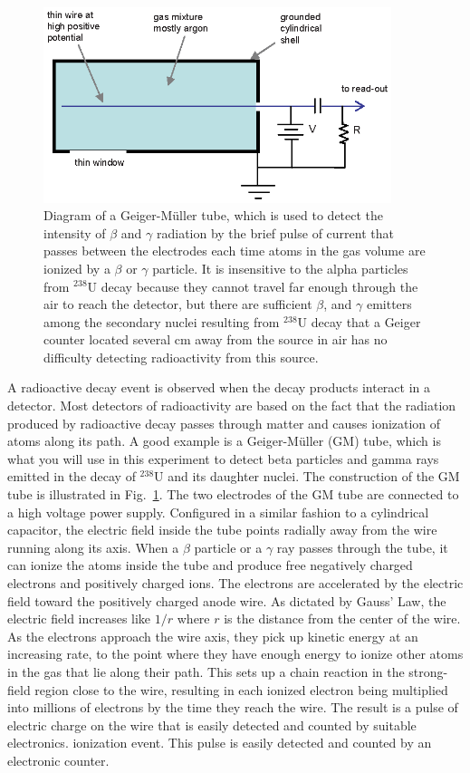 \documentclass{revtex4}
\begin{document}
\begin{figure}
\includegraphics[width=4in]{geigertube.eps}
\caption{\label{geigertube}
Diagram of a Geiger-M\"{u}ller tube, which is used to detect the intensity
of $\beta$ and $\gamma$ radiation by the brief pulse of current that passes
between the electrodes each time atoms in the gas volume are ionized by a
$\beta$ or $\gamma$ particle.  It is insensitive to the alpha particles
from $^{238}$U decay because they cannot travel far enough through the air
to reach the detector, but there are sufficient $\beta$, and $\gamma$
emitters among the secondary nuclei resulting from $^{238}$U decay that a
Geiger counter located several cm away from the source in air has no
difficulty detecting radioactivity from this source.}
\end{figure}

A radioactive decay event is observed when the decay products interact in a
detector.  Most detectors of radioactivity are based on the fact that the
radiation produced by radioactive decay passes through matter and causes
ionization of atoms along its path.  A good example is a Geiger-M\"{u}ller (GM)
tube, which is what you will use in this experiment to detect beta particles
and gamma rays emitted in the decay of $^{238}$U and its daughter nuclei.
The construction of the GM tube is illustrated in Fig.~\ref{geigertube}. The
two electrodes of the GM tube are connected to a high voltage power supply.
Configured in a similar fashion to a cylindrical capacitor, the electric
field inside the tube points radially away from the wire running along its
axis.  When a $\beta$ particle or a $\gamma$ ray passes through the tube, it
can ionize the atoms inside the tube and produce free negatively charged
electrons and positively charged ions. The electrons are accelerated by the
electric field toward the positively charged anode wire.  As dictated by
Gauss' Law, the electric field increases like $1/r$ where $r$ is the distance
from the center of the wire.  As the electrons approach the wire axis, they
pick up kinetic energy at an increasing rate, to the point where they have
enough energy to ionize other atoms in the gas that lie along their path.
This sets up a chain reaction in the strong-field region close to the wire,
resulting in each ionized electron being multiplied into millions of
electrons by the time they reach the wire.  The result is a pulse of
electric charge on the wire that is easily detected and counted by suitable
electronics.  ionization event. This pulse is easily detected and counted by
an electronic counter.
\end{document}
